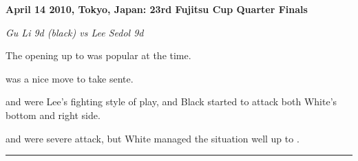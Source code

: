 \documentclass[letterpaper,12pt]{memoir}
\begin{document}
\textbf{April 14 2010, Tokyo, Japan: 23rd Fujitsu Cup Quarter Finals}

\textit{Gu Li 9d (black) vs Lee Sedol 9d}

The opening up to {} was popular at the time.

{} was a nice move to take sente.

{} and {} were Lee's fighting style of play, and Black started to attack both White's bottom and right side.

{} and {} were severe attack, but White managed the situation well up to {}.


\vfill

\rule{\textwidth}{0.5pt}
\end{document}

